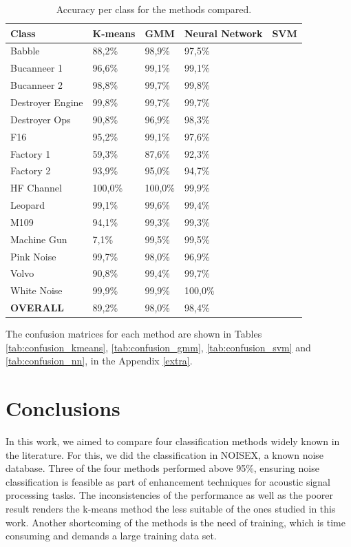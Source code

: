 \documentclass[12pt]{article}
\begin{document}
\begin{table}[ht]
\centering
\caption{Accuracy per class for the methods compared.}
\label{tab:acc}
\begin{tabular}{l|llll}
\hline
Class & K-means & GMM & Neural Network & SVM \\
\hline
Babble & 88,2\% & 98,9\% & 97,5\% &  \\
Bucanneer 1 & 96,6\% & 99,1\% & 99,1\% & \\
Bucanneer 2 & 98,8\% & 99,7\% & 99,8\% & \\
Destroyer Engine & 99,8\% & 99,7\% & 99,7\% & \\
Destroyer Ops & 90,8\% & 96,9\% & 98,3\% & \\
F16 & 95,2\% & 99,1\% & 97,6\% & \\
Factory 1 & 59,3\% & 87,6\% & 92,3\% & \\
Factory 2 & 93,9\% & 95,0\% & 94,7\% & \\
HF Channel & 100,0\% & 100,0\% & 99,9\% & \\
Leopard & 99,1\% & 99,6\% & 99,4\% & \\
M109 & 94,1\% & 99,3\% & 99,3\% & \\
Machine Gun & 7,1\% & 99,5\% & 99,5\% & \\
Pink Noise & 99,7\% & 98,0\% & 96,9\% & \\
Volvo & 90,8\% & 99,4\% & 99,7\% & \\
White Noise & 99,9\% & 99,9\% & 100,0\% & \\
\hline
\textbf{OVERALL} & 89,2\% & 98,0\% & 98,4\% & \\
\hline
\end{tabular}
\end{table}

The confusion matrices for each method are shown in Tables \ref{tab:confusion_kmeans}, \ref{tab:confusion_gmm}, \ref{tab:confusion_svm} and \ref{tab:confusion_nn}, in the Appendix \ref{extra}.

\section{Conclusions} \label{conc}

In this work, we aimed to compare four classification methods widely known in the literature. For this, we did the classification in NOISEX, a known noise database. Three of the four methods performed above 95\%, ensuring noise classification is feasible as part of enhancement techniques for acoustic signal processing tasks. The inconsistencies of the performance as well as the poorer result renders the k-means method the less suitable of the ones studied in this work. Another shortcoming of the methods is the need of training, which is time consuming and demands a large training data set.
\end{document}
